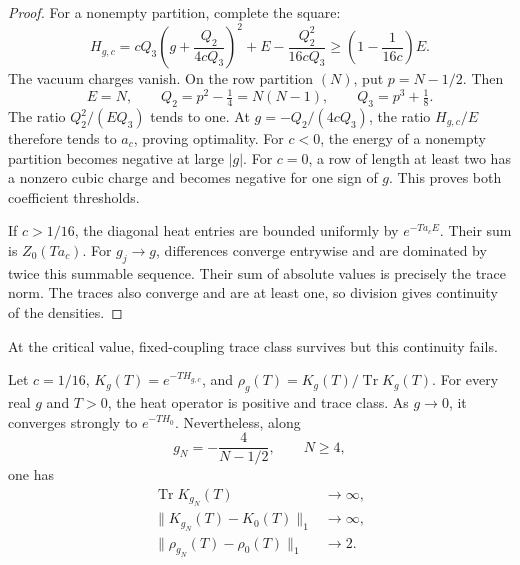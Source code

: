 \begin{proof}
For a nonempty partition, complete the square:
\[
 H_{g,c}
 =cQ_3\left(g+\frac{Q_2}{4cQ_3}\right)^2
       +E-\frac{Q_2^2}{16cQ_3}
 \geq\left(1-\frac1{16c}\right)E.
\]
The vacuum charges vanish. On the row partition \((N)\), put
\(p=N-1/2\). Then
\[
 E=N,\qquad Q_2=p^2-\tfrac14=N(N-1),\qquad
 Q_3=p^3+\tfrac18.
\]
The ratio \(Q_2^2/(EQ_3)\) tends to one. At
\(g=-Q_2/(4cQ_3)\), the ratio \(H_{g,c}/E\) therefore tends
to \(a_c\), proving optimality. For \(c<0\), the energy of
a nonempty partition becomes negative at large \(|g|\).
For \(c=0\), a row of length at least two has a nonzero cubic
charge and becomes negative for one sign of \(g\).
This proves both coefficient thresholds.

If \(c>1/16\), the diagonal heat entries are bounded uniformly
by \(e^{-Ta_cE}\). Their sum is \(Z_0(Ta_c)\).
For \(g_j\to g\), differences converge entrywise and are
dominated by twice this summable sequence. Their sum of absolute
values is precisely the trace norm. The traces also converge and
are at least one, so division gives continuity of the densities.
\end{proof}

At the critical value, fixed-coupling trace class survives but
this continuity fails.

\begin{theorem}\label{thm:vol2-critical-state-escape}
Let \(c=1/16\), \(K_g(T)=e^{-TH_{g,c}}\), and
\(\rho_g(T)=K_g(T)/\operatorname{Tr}K_g(T)\).
For every real \(g\) and \(T>0\), the heat operator is positive
and trace class. As \(g\to0\), it converges strongly to
\(e^{-TH_0}\). Nevertheless, along
\[
 g_N=-\frac4{N-1/2},\qquad N\geq4,
\]
one has
\begin{align*}
 \operatorname{Tr}K_{g_N}(T)&\longrightarrow\infty,\\
 \|K_{g_N}(T)-K_0(T)\|_1&\longrightarrow\infty,\\
 \|\rho_{g_N}(T)-\rho_0(T)\|_1&\longrightarrow2.
\end{align*}
\end{theorem}

